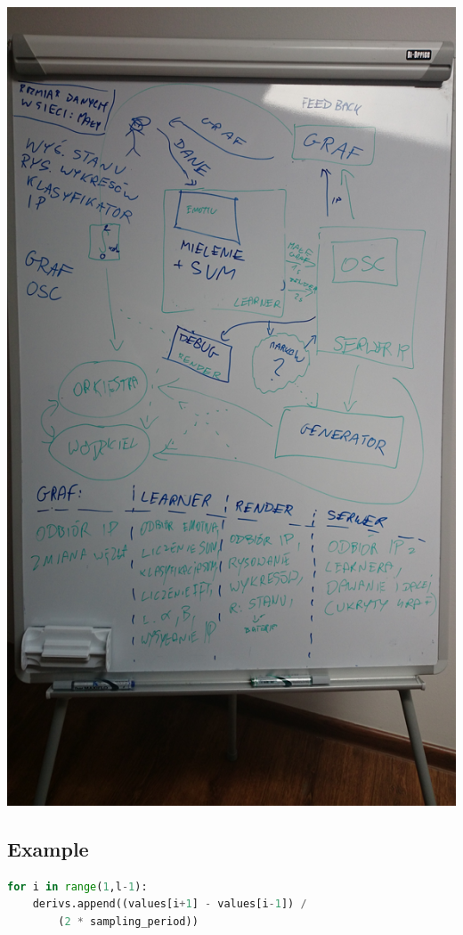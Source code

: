 \documentclass[11pt,leqno]{article}
\begin{document}
\begin{center}
\includegraphics[height=\textheight]{zadania}
\end{center}
\newpage
\subsection{Example}
\begin{lstlisting}[language=Python,frame=single]
for i in range(1,l-1):
    derivs.append((values[i+1] - values[i-1]) / 
        (2 * sampling_period))
\end{lstlisting}   
\end{document}
